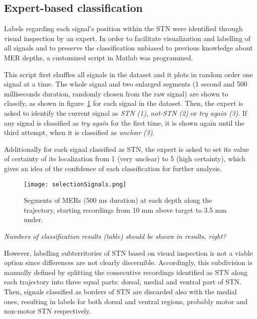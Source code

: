 \subsection{Expert-based classification}

Labels regarding each signal's position within the STN were identified  through visual inspection by an expert. In order to facilitate visualization and labelling of all signals and to preserve the classification unbiased to previous knowledge about MER depths, a customized script in Matlab was programmed. 

This script first shuffles all signals in the dataset and it plots in random order one signal at a time. The whole signal and two enlarged segments (1 second and 500 milliseconds duration, randomly chosen from the raw signal) are shown to classify, as shown in figure~\ref{fig:classifSgignals} for each signal in the dataset. Then, the expert is asked to identify the current signal as \textit{STN (1)}, \textit{not-STN (2)} or \textit{try again (3)}. If any signal is classified as \textit{try again} for the first time, it is shown again until the third attempt, when it is classified as \textit{unclear (3)}. 

Additionally for each signal classified as STN, the expert is asked to set its value of certainty of its localization from 1 (very unclear) to 5 (high certainty), which gives an idea of the confidence of each classification for further analysis.
 
\begin{figure}[!htb]
     \centering    
         \texttt{[image: selectionSignals.png]} 

       \caption{Segments of MERs (500 ms duration) at each depth along the trajectory, starting recordings from 10 mm above target to 3.5 mm under.}
     \label{fig:classifSgignals}
\end{figure} 

\textit{Numbers of classification results (table) should be shown in results, right? } 
 
However, labelling subterritories of STN based on visual inspection is not a viable option since differences are not clearly discernible. Accordingly, this subdivision is manually defined by splitting the consecutive recordings identified as STN along each trajectory into three equal parts: dorsal, medial and ventral part of STN. Then, signals classified as borders of STN are discarded also with the medial ones, resulting in labels for both dorsal and ventral regions, probably motor and non-motor STN respectively. 


